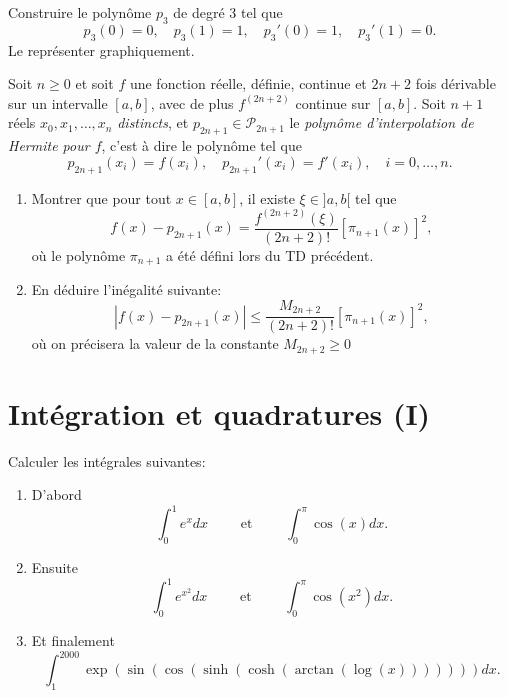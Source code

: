 \medskip

\begin{exercice}

Construire le polynôme $p_3$ de degré 3 tel que
\[
p_3(0) = 0, \quad p_3(1)=1, \quad p_3'(0)=1, \quad p_3'(1)=0.
\]
Le représenter graphiquement.

\end{exercice}

\medskip

\begin{exercice}

Soit $n\geq0$ et soit $f$ une fonction réelle, définie, continue et $2n+2$ fois dérivable sur un intervalle $[a,b]$, avec de plus $f^{(2n+2)}$ continue sur $[a,b]$.
%
Soit $n+1$ réels $x_0,x_1,\ldots,x_n$ \emph{distincts}, et $p_{2n+1} \in \mathcal{P}_{2n+1}$ le \emph{polynôme d'interpolation de Hermite pour $f$}, c'est à dire le polynôme tel que
\begin{equation*} %
p_{2n+1}(x_i)=f(x_i),\quad 
p_{2n+1}'(x_i)=f'(x_i),\quad i=0,\ldots,n.
\end{equation*}

\begin{enumerate}

\item Montrer que pour tout $x\in[a,b]$, il existe $\xi \in ]a,b[$ tel que
\[
f(x) - p_{2n+1} (x) = \frac{f^{(2n+2)}(\xi)}{(2n+2)!} [\pi_{n+1}(x)]^2,
\]
où le polynôme $\pi_{n+1}$ a été défini lors du TD précédent.

\item En déduire l'inégalité suivante:
\[
| f(x) - p_{2n+1} (x) | \leq \frac{M_{2n+2}}{(2n+2)!} [\pi_{n+1}(x)]^2,
\]
où on précisera la valeur de la constante $M_{2n+2} \geq 0$

\end{enumerate}

\end{exercice}

\newpage

\section{Intégration et quadratures (I)}

\begin{exercice}

Calculer les intégrales suivantes:

\begin{enumerate}

\item D'abord $$ \int_0^1 e^x dx \qquad \mbox{ et } \qquad \int_0^\pi \cos(x) dx.$$

\item Ensuite $$ \int_0^1 e^{x^2} dx \qquad \mbox{ et } \qquad \int_0^\pi \cos(x^2) dx.$$

\item Et finalement
\[
\int_1^{2000} \exp(\sin(\cos(\sinh(\cosh(\arctan(\log(x))))))) dx.
\]

\end{enumerate}

\end{exercice}

